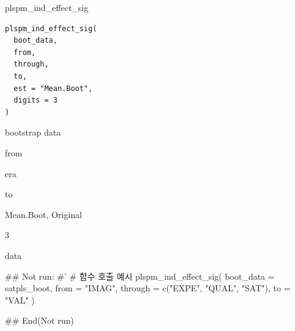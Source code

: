 \documentclass[a4paper]{book}
\begin{document}
%
\begin{Description}
plspm\_ind\_effect\_sig
\end{Description}
%
\begin{Usage}
\begin{verbatim}
plspm_ind_effect_sig(
  boot_data,
  from,
  through,
  to,
  est = "Mean.Boot",
  digits = 3
)
\end{verbatim}
\end{Usage}
%
\begin{Arguments}
\begin{ldescription}
\item[\code{boot\_data}] bootstrap data

\item[\code{from}] from

\item[\code{through}] era

\item[\code{to}] to

\item[\code{est}] Mean.Boot, Original

\item[\code{digits}] 3
\end{ldescription}
\end{Arguments}
%
\begin{Value}
data
\end{Value}
%
\begin{Examples}
\begin{ExampleCode}

\#\# Not run: 
#'
# 함수 호출 예시
plspm_ind_effect_sig(
  boot_data = satpls_boot,
  from = "IMAG",
  through = c("EXPE", "QUAL", "SAT"),
  to = "VAL"
)


## End(Not run)



\end{ExampleCode}
\end{Examples}
\end{document}
